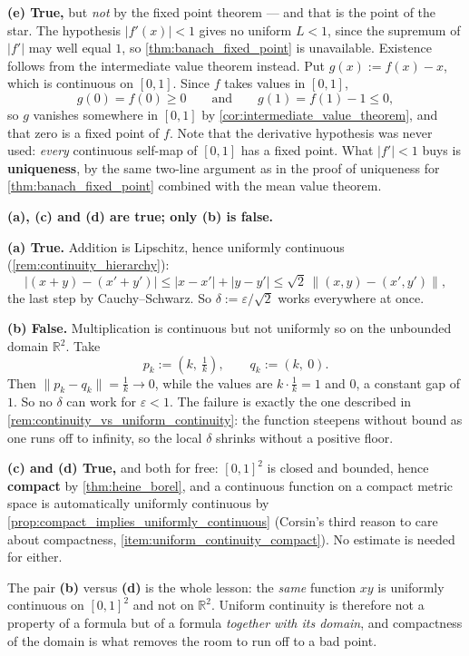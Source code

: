 \begin{exercisesolution}
\textbf{(e) True,} but \emph{not} by the fixed point theorem --- and that is the point of the
star. The hypothesis $|f'(x)| < 1$ gives no uniform $L < 1$, since the supremum of $|f'|$ may
well equal $1$, so \cref{thm:banach_fixed_point} is unavailable. Existence follows from the
intermediate value theorem instead. Put $g(x) := f(x) - x$, which is continuous on $[0,1]$. Since
$f$ takes values in $[0,1]$,
\[g(0) = f(0) \geq 0 \qquad\text{and}\qquad g(1) = f(1) - 1 \leq 0,\]
so $g$ vanishes somewhere in $[0,1]$ by \cref{cor:intermediate_value_theorem}, and that zero is
a fixed point of $f$. Note that the derivative hypothesis was never used: \emph{every} continuous
self-map of $[0,1]$ has a fixed point. What $|f'| < 1$ buys is \textbf{uniqueness}, by the same
two-line argument as in the proof of uniqueness for \cref{thm:banach_fixed_point} combined with
the mean value theorem.
\end{exercisesolution}

\begin{exercisesolution}
\textbf{(a), (c) and (d) are true; only (b) is false.}

\textbf{(a) True.} Addition is Lipschitz, hence uniformly continuous
(\cref{rem:continuity_hierarchy}):
\[\big|(x+y)-(x'+y')\big| \leq |x-x'| + |y-y'| \leq \sqrt2\,\big\lVert(x,y)-(x',y')\big\rVert,\]
the last step by Cauchy--Schwarz. So $\delta := \varepsilon/\sqrt2$ works everywhere at once.

\textbf{(b) False.} Multiplication is continuous but not uniformly so on the unbounded domain
$\mathbb{R}^2$. Take
\[p_k := \left(k,\ \tfrac1k\right), \qquad q_k := \left(k,\ 0\right).\]
Then $\lVert p_k - q_k\rVert = \tfrac1k \to 0$, while the values are $k \cdot \tfrac1k = 1$ and
$0$, a constant gap of $1$. So no $\delta$ can work for $\varepsilon < 1$. The failure is exactly
the one described in \cref{rem:continuity_vs_uniform_continuity}: the function steepens without
bound as one runs off to infinity, so the local $\delta$ shrinks without a positive floor.

\textbf{(c) and (d) True,} and both for free: $[0,1]^2$ is closed and bounded, hence
\textbf{compact} by \cref{thm:heine_borel}, and a continuous function on a compact metric space
is automatically uniformly continuous by
\cref{prop:compact_implies_uniformly_continuous} (Corsin's third reason to care about
compactness, \cref{item:uniform_continuity_compact}). No estimate is needed for either.

\begin{remark}
The pair \textbf{(b)} versus \textbf{(d)} is the whole lesson: the \emph{same} function $xy$ is
uniformly continuous on $[0,1]^2$ and not on $\mathbb{R}^2$. Uniform continuity is therefore not
a property of a formula but of a formula \emph{together with its domain}, and compactness of the
domain is what removes the room to run off to a bad point.
\end{remark}
\end{exercisesolution}

